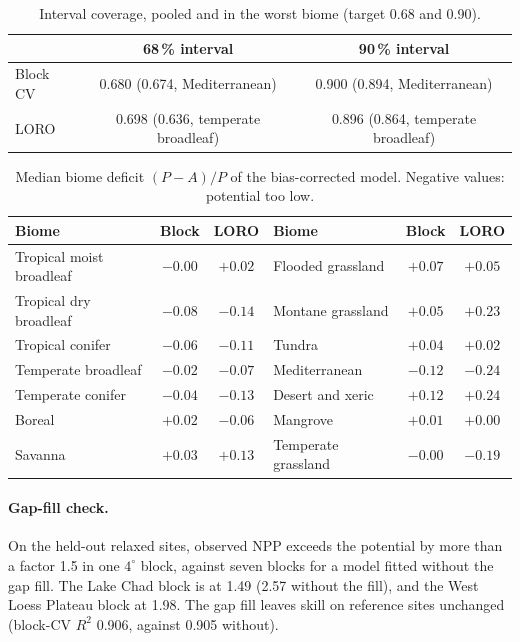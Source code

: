 \documentclass[11pt,a4paper]{article}
\begin{document}
\begin{table}[H]
\centering\small
\caption{Interval coverage, pooled and in the worst biome (target 0.68 and 0.90).}
\label{tab:coverage}
\begin{tabular}{lcc}
\toprule
 & 68\,\% interval & 90\,\% interval \\
\midrule
Block CV & 0.680 (0.674, Mediterranean) & 0.900 (0.894, Mediterranean) \\
LORO & 0.698 (0.636, temperate broadleaf) & 0.896 (0.864, temperate broadleaf) \\
\bottomrule
\end{tabular}
\end{table}

\begin{table}[H]
\centering\small
\caption{Median biome deficit $(P-A)/P$ of the bias-corrected model. Negative values: potential
too low.}
\label{tab:biomebias}
\begin{tabular}{lcc|lcc}
\toprule
Biome & Block & LORO & Biome & Block & LORO \\
\midrule
Tropical moist broadleaf & $-0.00$ & $+0.02$ & Flooded grassland & $+0.07$ & $+0.05$ \\
Tropical dry broadleaf & $-0.08$ & $-0.14$ & Montane grassland & $+0.05$ & $+0.23$ \\
Tropical conifer & $-0.06$ & $-0.11$ & Tundra & $+0.04$ & $+0.02$ \\
Temperate broadleaf & $-0.02$ & $-0.07$ & Mediterranean & $-0.12$ & $-0.24$ \\
Temperate conifer & $-0.04$ & $-0.13$ & Desert and xeric & $+0.12$ & $+0.24$ \\
Boreal & $+0.02$ & $-0.06$ & Mangrove & $+0.01$ & $+0.00$ \\
Savanna & $+0.03$ & $+0.13$ & Temperate grassland & $-0.00$ & $-0.19$ \\
\bottomrule
\end{tabular}
\end{table}

\paragraph{Gap-fill check.} On the held-out relaxed sites, observed NPP exceeds the potential by
more than a factor 1.5 in one $4^\circ$ block, against seven blocks for a model fitted without
the gap fill. The Lake Chad block is at 1.49 (2.57 without the fill), and the West Loess Plateau
block at 1.98. The gap fill leaves skill on reference sites unchanged (block-CV $R^2$ 0.906,
against 0.905 without).
\end{document}
